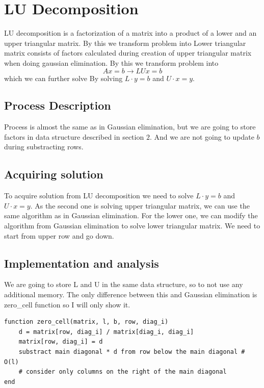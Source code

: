 \documentclass[11pt]{article}
\begin{document}
\section{LU Decomposition}
LU decomposition is a factorization of a matrix into a product of a lower and an upper triangular matrix.
By this we transform problem into
Lower triangular matrix consists of factors calculated during creation of upper triangular matrix when doing gaussian elimination.
By this we transform problem into 
$$Ax = b \rightarrow LU x = b$$
which we can further solve By solving $L \cdot y = b$ and $U \cdot x = y$.
\subsection*{Process Description}
Process is almost the same as in Gaussian elimination, but we are going to store factors in data structure described in section $2$.
And we are not going to update $b$ during substracting rows.
\subsection*{Acquiring solution}
To acquire solution from LU decomposition we need to solve $L \cdot y = b$ and $U \cdot x = y$. 
As the second one is solving upper triangular matrix, we can use the same algorithm as in Gaussian elimination.
For the lower one, we can modify the algorithm from Gaussian elimination to solve lower triangular matrix. We need to start from upper row and go down.
\subsection*{Implementation and analysis}
We are going to store L and U in the same data structure, so to not use any additional memory.
The only difference between this and Gaussian elimination is zero\_cell function so I will only show it.
\begin{lstlisting}
function zero_cell(matrix, l, b, row, diag_i)
    d = matrix[row, diag_i] / matrix[diag_i, diag_i]
    matrix[row, diag_i] = d
    substract main diagonal * d from row below the main diagonal # O(l)
    # consider only columns on the right of the main diagonal
end
\end{lstlisting}
\end{document}
